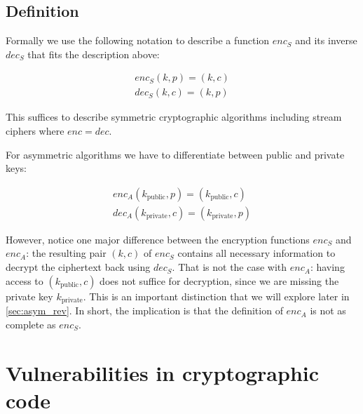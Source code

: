 \documentclass[a4paper,10pt,openright]{memoir}
\def\enc{\ensuremath{\mathit{enc}}}
\def\dec{\ensuremath{\mathit{dec}}}
\begin{document}
\subsection{Definition}

Formally we use the following notation to describe a function 
$\enc_S$ and its inverse $\dec_S$ that fits the description above:

\begin{align*}
\enc_S(k,p) = (k,c) \\
\dec_S(k,c) = (k,p) 
\end{align*}

This suffices to describe symmetric cryptographic algorithms including 
stream ciphers where $\enc = \dec$.

For asymmetric algorithms we have to differentiate between public and 
private keys:

\begin{align*}
\enc_A(k_\text{public},p) = (k_\text{public},c) \\
\dec_A(k_\text{private},c) = (k_\text{private},p) 
\end{align*}

However, notice one major difference between the encryption functions 
$\enc_S$ and $\enc_A$: the resulting pair $(k, c)$ of $\enc_S$ contains 
all necessary information to decrypt the ciphertext back using 
$\dec_S$. That is not the case with $\enc_A$: having access to 
$(k_\text{public},c)$ does not suffice for decryption, since we are 
missing the private key $k_\text{private}$. This is an important 
distinction that we will explore later in \ref{sec:asym_rev}. In short, 
the implication is that the definition of $\enc_A$ is not as complete 
as $\enc_S$.

\section{Vulnerabilities in cryptographic code}
\end{document}
